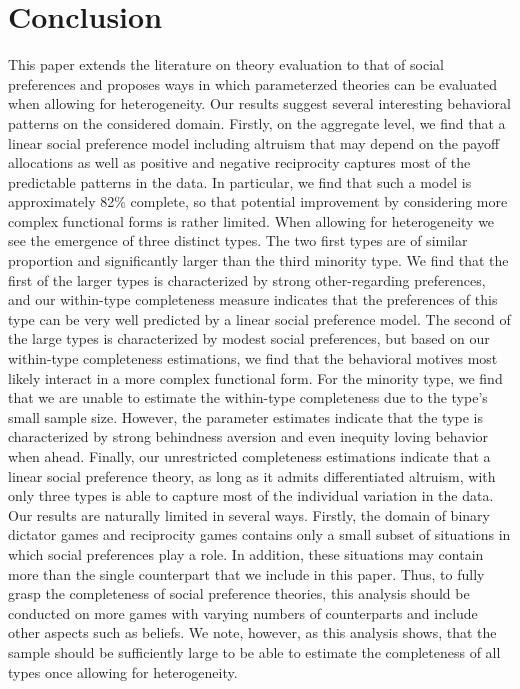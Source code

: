 \documentclass[11pt,a4paper]{article}
\theoremstyle{definition}
\begin{document}
\section{Conclusion}
\label{sec:conclusion}
This paper extends the literature on theory evaluation to that of social preferences and proposes ways in which parameterzed theories can be evaluated when allowing for heterogeneity. Our results suggest several interesting behavioral patterns on the considered domain. Firstly, on the aggregate level, we find that a linear social preference model including altruism that may depend on the payoff allocations as well as positive and negative reciprocity captures most of the predictable patterns in the data. In particular, we find that such a model is approximately 82\% complete, so that potential improvement by considering more complex functional forms is rather limited. When allowing for heterogeneity we see the emergence of three distinct types. The two first types are of similar proportion and significantly larger than the third minority type. We find that the first of the larger types is characterized by strong other-regarding preferences, and our within-type completeness measure indicates that the preferences of this type can be very well predicted by a linear social preference model. The second of the large types is characterized by modest social preferences, but based on our within-type completeness estimations, we find that the behavioral motives most likely interact in a more complex functional form.  For the minority type, we find that we are unable to estimate the within-type completeness due to the type's small sample size. However, the parameter estimates indicate that the type is characterized by strong behindness aversion and even inequity loving behavior when ahead. Finally, our unrestricted completeness estimations indicate that a linear social preference theory, as long as it admits differentiated altruism, with only three types is able to capture most of the individual variation in the data. Our results are naturally limited in several ways. Firstly, the domain of binary dictator games and reciprocity games contains only a small subset of situations in which social preferences play a role. In addition, these situations may contain more than the single counterpart that we include in this paper. Thus, to fully grasp the completeness of social preference theories, this analysis should be conducted on more games with varying numbers of counterparts and include other aspects such as beliefs. We note, however, as this analysis shows, that the sample should be sufficiently large to be able to estimate the completeness of all types once allowing for heterogeneity.
\clearpage
\end{document}
